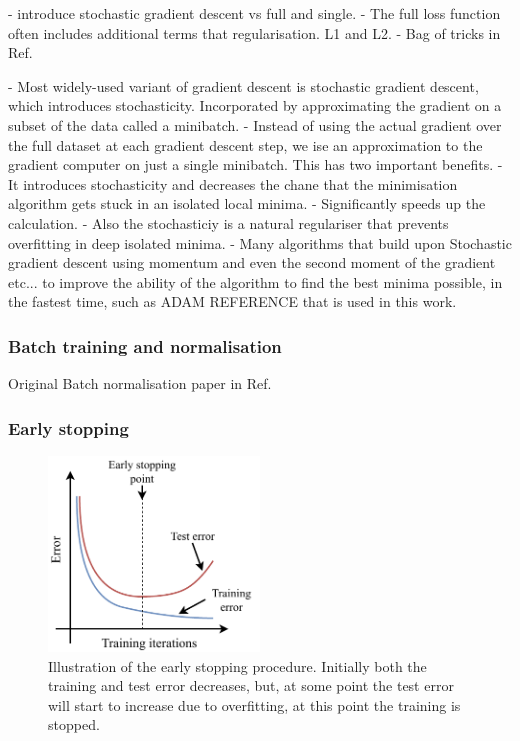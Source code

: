 - introduce stochastic gradient descent vs full and single.
- The full loss function often includes additional terms that regularisation. L1 and L2.
- Bag of tricks in Ref.~\cite{he2019}

- Most widely-used variant of gradient descent is stochastic gradient descent, which introduces
stochasticity. Incorporated by approximating the gradient on a subset of the data called a
minibatch.
- Instead of using the actual gradient over the full dataset at each gradient descent step, we ise
an approximation to the gradient computer on just a single minibatch. This has two important
benefits.
- It introduces stochasticity and decreases the chane that the minimisation algorithm gets stuck
in an isolated local minima.
- Significantly speeds up the calculation.
- Also the stochasticiy is a natural regulariser that prevents overfitting in deep isolated
minima.
- Many algorithms that build upon Stochastic gradient descent using momentum and even the second
moment of the gradient etc... to improve the ability of the algorithm to find the best minima
possible, in the fastest time, such as ADAM REFERENCE that is used in this work.

\subsubsection*{Batch training and normalisation}
Original Batch normalisation paper in Ref.~\cite{ioffe2015}

\subsubsection*{Early stopping}

\begin{figure} %
    \includegraphics[width=0.5\textwidth]{diagrams/6-cvn/early_stopping.pdf}
    \caption[Illustration of the early stopping procedure.]
    {Illustration of the early stopping procedure. Initially both the training and test error
        decreases, but, at some point the test error will start to increase due to overfitting, at
        this point the training is stopped.}
    \label{fig:early_stopping}
\end{figure}

